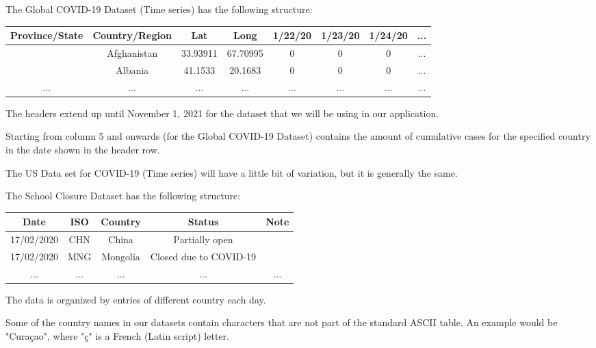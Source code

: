 \documentclass[fontsize=11pt]{article}
\begin{document}
    The Global COVID-19 Dataset (Time series) has the following structure:

    \begin{center}
        \begin{tabular}{ |c|c|c|c|c|c|c|c| }
            \hline
            Province/State & Country/Region & Lat      & Long     & 1/22/20 & 1/23/20 & 1/24/20 & ... \\
            \hline
            & Afghanistan    & 33.93911 & 67.70995 & 0       & 0       & 0       & ... \\
            \hline
            & Albania        & 41.1533  & 20.1683  & 0       & 0       & 0       & ... \\
            \hline
            ...            & ...            & ...      & ...      & ...     & ...     & ...     & ... \\
            \hline
        \end{tabular}
    \end{center}

    The headers extend up until November 1, 2021 for the dataset that we will be using in our application.

    Starting from column 5 and onwards (for the Global COVID-19 Dataset) contains the amount of cumulative cases for the specified country in the date shown in the header row.

    The US Data set for COVID-19 (Time series) will have a little bit of variation, but it is generally the same.

    The School Closure Dataset has the following structure:
    \begin{center}
        \begin{tabular}{ |c|c|c|c|c| }
            \hline
            Date       & ISO & Country  & Status                  & Note\\
            \hline
            17/02/2020 & CHN & China    & Partially open          & \\
            \hline
            17/02/2020 & MNG & Mongolia & Closed due to COVID-19  & \\
            \hline
            ...        & ... & ...      & ...                     & ...\\
            \hline
        \end{tabular}
    \end{center}

    The data is organized by entries of different country each day.

    Some of the country names in our datasets contain characters that are not part of the standard ASCII table. An example would be "Cura\c{c}ao", where "\c{c}" is a French (Latin script) letter.
\end{document}
